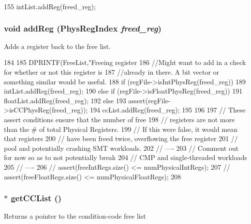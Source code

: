 \begin{DoxyCode}
155 { intList.addReg(freed_reg); }
\end{DoxyCode}
\hypertarget{classUnifiedFreeList_a01fd4688f223ccaeef83b3adf2cb2acc}{
\subsubsection[{addReg}]{\setlength{\rightskip}{0pt plus 5cm}void addReg ({\bf PhysRegIndex} {\em freed\_\-reg})}}
\label{classUnifiedFreeList_a01fd4688f223ccaeef83b3adf2cb2acc}
Adds a register back to the free list. 


\begin{DoxyCode}
184 {
185     DPRINTF(FreeList,"Freeing register %
186     //Might want to add in a check for whether or not this register is
187     //already in there.  A bit vector or something similar would be useful.
188     if (regFile->isIntPhysReg(freed_reg)) {
189         intList.addReg(freed_reg);
190     } else if (regFile->isFloatPhysReg(freed_reg)) {
191         floatList.addReg(freed_reg);
192     } else {
193         assert(regFile->isCCPhysReg(freed_reg));
194         ccList.addReg(freed_reg);
195     }
196 
197     // These assert conditions ensure that the number of free
198     // registers are not more than the # of total Physical  Registers.
199     // If this were false, it would mean that registers
200     // have been freed twice, overflowing the free register
201     // pool and potentially crashing SMT workloads.
202     // ----
203     // Comment out for now so as to not potentially break
204     // CMP and single-threaded workloads
205     // ----
206     // assert(freeIntRegs.size() <= numPhysicalIntRegs);
207     // assert(freeFloatRegs.size() <= numPhysicalFloatRegs);
208 }
\end{DoxyCode}
\hypertarget{classUnifiedFreeList_a3832e036b3106722cadba456ac2e8921}{
\subsubsection[{getCCList}]{$\ast$ getCCList ()}}
\label{classUnifiedFreeList_a3832e036b3106722cadba456ac2e8921}
Returns a pointer to the condition-\/code free list 


